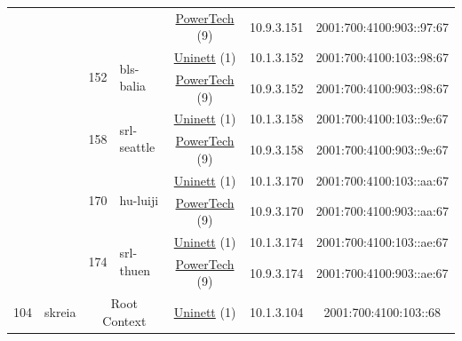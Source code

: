 \begin{small}
\begin{center}
\begin{longtable}{|c|c|c|c|c|c|c|c|}
  &  &  &  & \multicolumn{2}{|c|}{\tiny{\href{http://www.powertech.no}{PowerTech} (9)}} & \tiny{10.9.3.151} & \tiny{2001:700:4100:903::97:67} \\* \cline{3-3}\cline{4-4}\cline{5-5}\cline{6-6}\cline{7-7}\cline{8-8}
  &  & \multirow{2}{*}{\tiny{152}} & \multicolumn{1}{|l|}{\multirow{2}{*}{\tiny{bls-balia}}} & \multicolumn{2}{|c|}{\tiny{\href{https://www.uninett.no}{Uninett} (1)}} & \tiny{10.1.3.152} & \tiny{2001:700:4100:103::98:67} \\* \cline{5-5}\cline{6-6}\cline{7-7}\cline{8-8}
  &  &  &  & \multicolumn{2}{|c|}{\tiny{\href{http://www.powertech.no}{PowerTech} (9)}} & \tiny{10.9.3.152} & \tiny{2001:700:4100:903::98:67} \\* \cline{3-3}\cline{4-4}\cline{5-5}\cline{6-6}\cline{7-7}\cline{8-8}
  &  & \multirow{2}{*}{\tiny{158}} & \multicolumn{1}{|l|}{\multirow{2}{*}{\tiny{srl-seattle}}} & \multicolumn{2}{|c|}{\tiny{\href{https://www.uninett.no}{Uninett} (1)}} & \tiny{10.1.3.158} & \tiny{2001:700:4100:103::9e:67} \\* \cline{5-5}\cline{6-6}\cline{7-7}\cline{8-8}
  &  &  &  & \multicolumn{2}{|c|}{\tiny{\href{http://www.powertech.no}{PowerTech} (9)}} & \tiny{10.9.3.158} & \tiny{2001:700:4100:903::9e:67} \\* \cline{3-3}\cline{4-4}\cline{5-5}\cline{6-6}\cline{7-7}\cline{8-8}
  &  & \multirow{2}{*}{\tiny{170}} & \multicolumn{1}{|l|}{\multirow{2}{*}{\tiny{hu-luiji}}} & \multicolumn{2}{|c|}{\tiny{\href{https://www.uninett.no}{Uninett} (1)}} & \tiny{10.1.3.170} & \tiny{2001:700:4100:103::aa:67} \\* \cline{5-5}\cline{6-6}\cline{7-7}\cline{8-8}
  &  &  &  & \multicolumn{2}{|c|}{\tiny{\href{http://www.powertech.no}{PowerTech} (9)}} & \tiny{10.9.3.170} & \tiny{2001:700:4100:903::aa:67} \\* \cline{3-3}\cline{4-4}\cline{5-5}\cline{6-6}\cline{7-7}\cline{8-8}
  &  & \multirow{2}{*}{\tiny{174}} & \multicolumn{1}{|l|}{\multirow{2}{*}{\tiny{srl-thuen}}} & \multicolumn{2}{|c|}{\tiny{\href{https://www.uninett.no}{Uninett} (1)}} & \tiny{10.1.3.174} & \tiny{2001:700:4100:103::ae:67} \\* \cline{5-5}\cline{6-6}\cline{7-7}\cline{8-8}
  &  &  &  & \multicolumn{2}{|c|}{\tiny{\href{http://www.powertech.no}{PowerTech} (9)}} & \tiny{10.9.3.174} & \tiny{2001:700:4100:903::ae:67} \\ \hline
 \multirow{24}{*}{\tiny{104}} & \multicolumn{1}{|l|}{\multirow{24}{*}{\tiny{skreia}}} & \multicolumn{2}{|c|}{\multirow{2}{*}{\tiny{Root Context}}} & \multicolumn{2}{|c|}{\tiny{\href{https://www.uninett.no}{Uninett} (1)}} & \tiny{10.1.3.104} & \tiny{2001:700:4100:103::68} \\* \cline{5-5}\cline{6-6}\cline{7-7}\cline{8-8}

\end{longtable}
\end{center}
\end{small}
